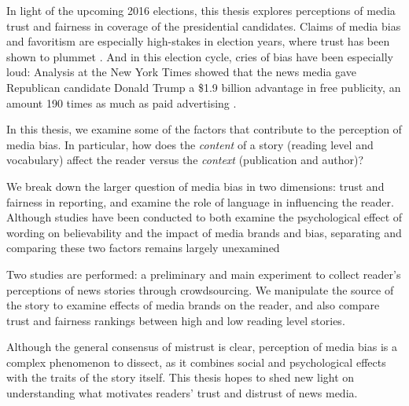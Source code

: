 In light of the upcoming 2016 elections, this thesis explores perceptions of media trust and fairness in coverage of the presidential candidates. Claims of media bias and favoritism are especially high-stakes in election years, where trust has been shown to plummet \cite{Gallup-trust-2015}. And in this election cycle, cries of bias have been especially loud: Analysis at the New York Times showed that the news media gave Republican candidate Donald Trump a \$1.9 billion advantage in free publicity, an amount 190 times as much as paid advertising \cite{Trump-advantage}.

In this thesis, we examine some of the factors that contribute to the perception of media bias. In particular, how does the \emph{content} of a story (reading level and vocabulary) affect the reader versus the \emph{context} (publication and author)? 

We break down the larger question of media bias in two dimensions: trust and fairness in reporting, and examine the role of language in influencing the reader.  Although studies have been conducted to both examine the psychological effect of wording on believability and the impact of media brands and bias, separating and comparing these two factors remains largely unexamined \cite{weisberg2008seductive, baum2008eye}

Two studies are performed: a preliminary and main experiment to collect reader's perceptions of news stories through crowdsourcing. We manipulate the source of the story to examine effects of media brands on the reader, and also compare trust and fairness rankings between high and low reading level stories.

Although the general consensus of mistrust is clear, perception of media bias is a complex phenomenon to dissect, as it combines social and psychological effects with the traits of the story itself. This thesis hopes to shed new light on understanding what motivates readers' trust and distrust of news media.



 
 
